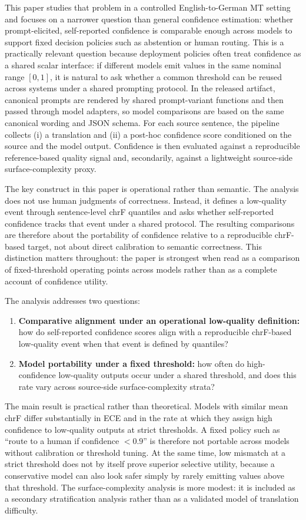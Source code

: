 \documentclass[10pt,conference]{IEEEtran}
\begin{document}
This paper studies that problem in a controlled English-to-German MT setting and focuses on a narrower question than general confidence estimation: whether prompt-elicited, self-reported confidence is comparable enough across models to support fixed decision policies such as abstention or human routing. This is a practically relevant question because deployment policies often treat confidence as a shared scalar interface: if different models emit values in the same nominal range $[0,1]$, it is natural to ask whether a common threshold can be reused across systems under a shared prompting protocol. In the released artifact, canonical prompts are rendered by shared prompt-variant functions and then passed through model adapters, so model comparisons are based on the same canonical wording and JSON schema. For each source sentence, the pipeline collects (i) a translation and (ii) a post-hoc confidence score conditioned on the source and the model output. Confidence is then evaluated against a reproducible reference-based quality signal and, secondarily, against a lightweight source-side surface-complexity proxy.

The key construct in this paper is operational rather than semantic. The analysis does not use human judgments of correctness. Instead, it defines a low-quality event through sentence-level chrF quantiles and asks whether self-reported confidence tracks that event under a shared protocol. The resulting comparisons are therefore about the portability of confidence relative to a reproducible chrF-based target, not about direct calibration to semantic correctness. This distinction matters throughout: the paper is strongest when read as a comparison of fixed-threshold operating points across models rather than as a complete account of confidence utility.

The analysis addresses two questions:
\begin{enumerate}[leftmargin=*]
\item \textbf{Comparative alignment under an operational low-quality definition:} how do self-reported confidence scores align with a reproducible chrF-based low-quality event when that event is defined by quantiles?
\item \textbf{Model portability under a fixed threshold:} how often do high-confidence low-quality outputs occur under a shared threshold, and does this rate vary across source-side surface-complexity strata?
\end{enumerate}

The main result is practical rather than theoretical. Models with similar mean chrF differ substantially in ECE and in the rate at which they assign high confidence to low-quality outputs at strict thresholds. A fixed policy such as ``route to a human if confidence $< 0.9$'' is therefore not portable across models without calibration or threshold tuning. At the same time, low mismatch at a strict threshold does not by itself prove superior selective utility, because a conservative model can also look safer simply by rarely emitting values above that threshold. The surface-complexity analysis is more modest: it is included as a secondary stratification analysis rather than as a validated model of translation difficulty.
\end{document}
